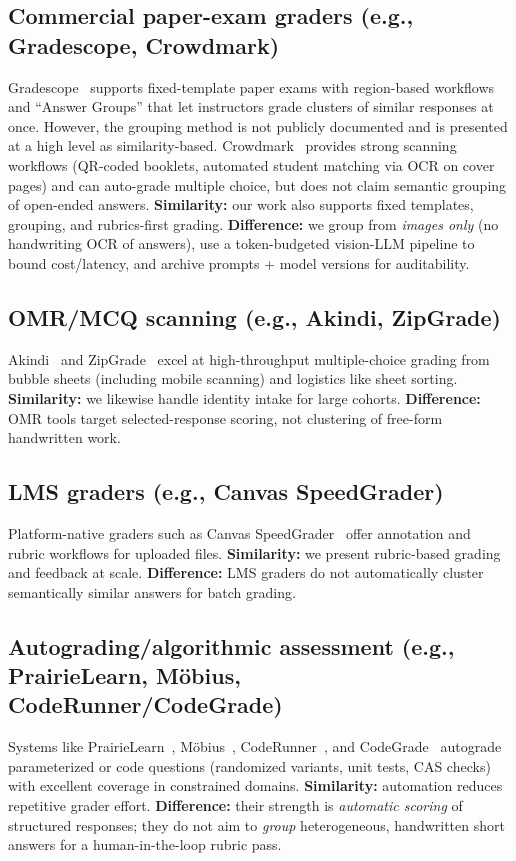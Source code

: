 \documentclass[ms,twoside,print]{nuthesis}
\newcommand{\Brand}[1]{\mbox{#1}} %
\begin{document}
\subsection{Commercial paper-exam graders (e.g., \Brand{Gradescope}, \Brand{Crowdmark})}
\Brand{Gradescope}~\cite{gradescope} supports fixed-template paper exams with region-based workflows and
\enquote{Answer Groups} that let instructors grade clusters of similar responses at once. However, the
grouping method is not publicly documented and is presented at a high level as similarity-based.
\Brand{Crowdmark}~\cite{crowdmark} provides strong scanning workflows (QR-coded booklets, automated
student matching via OCR on cover pages) and can auto-grade multiple choice, but does not claim
semantic grouping of open-ended answers. \textbf{Similarity:} our work also supports fixed templates,
grouping, and rubrics-first grading. \textbf{Difference:} we group from \emph{images only} (no handwriting
OCR of answers), use a token-budgeted vision-LLM pipeline to bound cost/latency, and archive
prompts + model versions for auditability.

\subsection{OMR/MCQ scanning (e.g., \Brand{Akindi}, \Brand{ZipGrade})}
\Brand{Akindi}~\cite{akindi} and \Brand{ZipGrade}~\cite{zipgrade} excel at high-throughput multiple-choice grading from
bubble sheets (including mobile scanning) and logistics like sheet sorting. \textbf{Similarity:} we likewise
handle identity intake for large cohorts. \textbf{Difference:} OMR tools target selected-response scoring,
not clustering of free-form handwritten work.

\subsection{LMS graders (e.g., \Brand{Canvas} SpeedGrader)}
Platform-native graders such as \Brand{Canvas} SpeedGrader~\cite{canvas-speedgrader} offer annotation and rubric
workflows for uploaded files. \textbf{Similarity:} we present rubric-based grading and feedback at scale.
\textbf{Difference:} LMS graders do not automatically cluster semantically similar answers for batch grading.

\subsection{Autograding/algorithmic assessment (e.g., \Brand{PrairieLearn}, \Brand{M{\"o}bius}, \Brand{CodeRunner}/\Brand{CodeGrade})}
Systems like \Brand{PrairieLearn}~\cite{prairielearn}, \Brand{M{\"o}bius}~\cite{mobius}, \Brand{CodeRunner}~\cite{coderunner}, and
\Brand{CodeGrade}~\cite{codegrade} autograde parameterized or code questions (randomized variants, unit tests,
CAS checks) with excellent coverage in constrained domains. \textbf{Similarity:} automation reduces
repetitive grader effort. \textbf{Difference:} their strength is \emph{automatic scoring} of structured
responses; they do not aim to \emph{group} heterogeneous, handwritten short answers for a human-in-the-loop
rubric pass.
\end{document}
